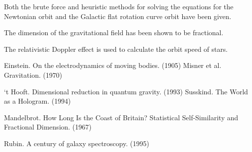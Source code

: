\documentclass[12pt]{article}
\begin{document}
Both the brute force and heuristic methods for solving the equations for the Newtonian orbit and the Galactic flat rotation curve orbit have been given.

The dimension of the gravitational field has been shown to be fractional.

The relativistic Doppler effect is used to calculate the orbit speed of stars.



\pagebreak



\begin{thebibliography}{9}

 Einstein. On the electrodynamics of moving bodies. (1905)
 Misner et al. Gravitation. (1970)

 `t Hooft. Dimensional reduction in quantum gravity. (1993)
 Susskind. The World as a Hologram. (1994)

 Mandelbrot. How Long Is the Coast of Britain? Statistical Self-Similarity and Fractional Dimension. (1967)

 Rubin. A century of galaxy spectroscopy. (1995) 





\end{thebibliography}
\end{document}
